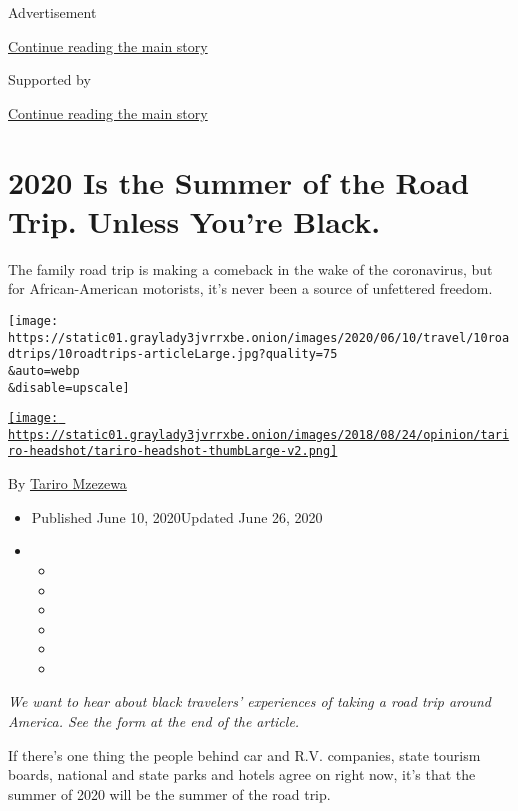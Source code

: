 Advertisement

\protect\hyperlink{after-top}{Continue reading the main story}

Supported by

\protect\hyperlink{after-sponsor}{Continue reading the main story}

\hypertarget{2020-is-the-summer-of-the-road-trip-unless-youre-black}{%
\section{2020 Is the Summer of the Road Trip. Unless You're
Black.}\label{2020-is-the-summer-of-the-road-trip-unless-youre-black}}

The family road trip is making a comeback in the wake of the
coronavirus, but for African-American motorists, it's never been a
source of unfettered freedom.

\texttt{[image: https://static01.graylady3jvrrxbe.onion/images/2020/06/10/travel/10roadtrips/10roadtrips-articleLarge.jpg?quality=75\\\&auto=webp\\\&disable=upscale]}

\href{https://www.nytimes3xbfgragh.onion/by/tariro-mzezewa}{\texttt{[image: https://static01.graylady3jvrrxbe.onion/images/2018/08/24/opinion/tariro-headshot/tariro-headshot-thumbLarge-v2.png]}}

By \href{https://www.nytimes3xbfgragh.onion/by/tariro-mzezewa}{Tariro
Mzezewa}

\begin{itemize}
\item
  Published June 10, 2020Updated June 26, 2020
\item
  \begin{itemize}
  \item
  \item
  \item
  \item
  \item
  \item
  \end{itemize}
\end{itemize}

\emph{We want to hear about black travelers' experiences of taking a
road trip around America. See the form at the end of the article.}

If there's one thing the people behind car and R.V. companies, state
tourism boards, national and state parks and hotels agree on right now,
it's that the summer of 2020 will be the summer of the road trip.


